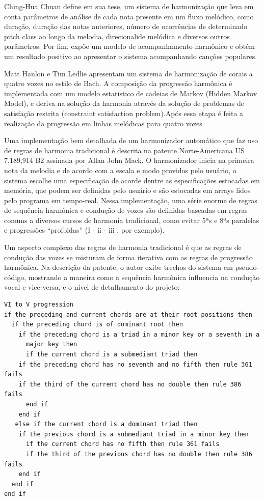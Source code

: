 \documentclass{ppgmus}
\begin{document}

Ching-Hua Chuan define em sua tese, um sistema de harmonização que leva em conta parâmetros
de análise de cada nota presente em um fluxo melódico, como duração, duração das notas anteriores, número
de ocorrências de determinado pitch class ao longo da melodia, direcionalide melódica e diversos outros
parâmetros. Por fim, expõe um modelo de acompanhamento harmônico e obtém um resultado positivo ao apresentar
o sistema acompanhando canções populares.

Matt Hanlon e Tim Ledlie apresentam um sistema de harmonização de corais a quatro vozes no estilo de Bach.
A composição da progressão harmônica é implementada com um modelo estatístico de cadeias de Markov
(Hidden Markov Model), e deriva na solução da harmonia através da solução de problemas
de satisfação restrita (constraint satisfaction problem).Após
essa etapa é feita a realização da progressão em linhas melódicas para quatro vozes

Uma implementação bem detalhada de um harmonizador automático que faz uso de
 regras de harmonia tradicional é descrita na patente Norte-Americana 
US 7,189,914 B2  assinada por Allan John Mack. O harmonizador inicia
na primeira nota da melodia e de acordo com a escala e modo providos
pelo usuário, o sistema escolhe uma especificação de acorde dentre
as especificações estocadas em memória, que podem ser definidas pelo usuário
e são estocadas em arrays lidos pelo programa em tempo-real.
Nessa implementação, uma série enorme de regras de sequência harmônica e 
condução de vozes são definidas baseadas em regras comuns a diversos cursos
de harmonia tradicional, como evitar 5ªs e 8ªs paralelas e progressões
``proibidas'' (I - ii - iii , por exemplo).

Um aspecto complexo das regras de harmonia tradicional é que as regras
de condução das vozes se misturam de forma iterativa com as regras de
progressão harmônica. Na descrição da patente, o autor exibe trechos do sistema em pseudo-código,
mostrando a maneira como a sequência harmônica influencia na condução vocal e vice-versa,
e o nível de detalhamento do projeto:

\begin{verbatim}
VI to V progression
if the preceding and current chords are at their root positions then
  if the preceding chord is of dominant root then
    if the preceding chord is a triad in a minor key or a seventh in a 
      major key then
      if the current chord is a submediant triad then
	if the preceding chord has no seventh and no fifth then rule 361 fails
	if the third of the current chord has no double then rule 386 fails
      end if
    end if
   else if the current chord is a dominant triad then
    if the previous chord is a submediant triad in a minor key then
      if the current chord has no fifth then rule 361 fails
      if the third of the previous chord has no double then rule 386 fails
    end if
  end if
end if
\end{verbatim}
\end{document}
